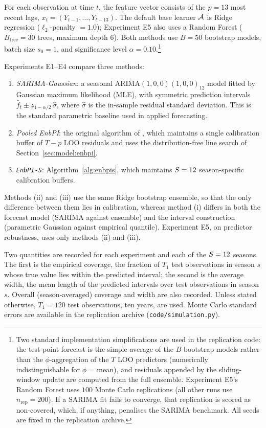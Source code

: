 For each observation at time $t$, the feature vector consists of the
$p = 13$ most recent lags, $x_t = (Y_{t-1}, \ldots, Y_{t-13})$.
The default base learner $\mathcal{A}$ is Ridge regression
($\ell_2$-penalty $= 1.0$); Experiment E5 also uses a Random Forest
($B_{\mathrm{tree}} = 30$ trees, maximum depth 6).  Both methods use
$B = 50$ bootstrap models, batch size $s_0 = 1$, and significance
level $\alpha = 0.10$.\footnote{Two standard implementation
simplifications are used in the replication code: the test-point
forecast is the simple average of the $B$ bootstrap models rather
than the $\phi$-aggregation of the $T$ LOO predictors (numerically
indistinguishable for $\phi$ = mean), and residuals appended by the
sliding-window update are computed from the full ensemble.
Experiment E5's Random Forest uses $100$ Monte Carlo replications
(all other runs use $n_{\mathrm{rep}} = 200$).  If a SARIMA fit fails
to converge, that replication is scored as non-covered, which, if
anything, penalises the SARIMA benchmark.  All seeds are fixed in the
replication archive.}

Experiments E1--E4 compare three methods:
\begin{enumerate}[label=(\roman*)]
  \item \emph{SARIMA-Gaussian}: a seasonal ARIMA$(1,0,0)(1,0,0)_{12}$
    model fitted by Gaussian maximum likelihood (MLE), with
    symmetric prediction intervals
    $\hat{f}_t \pm z_{1-\alpha/2}\,\hat{\sigma}$,
    where $\hat{\sigma}$ is the in-sample residual standard deviation.
    This is the standard parametric baseline used in applied
    forecasting.
  \item \emph{Pooled EnbPI}: the original algorithm of
    \citet{xu2023conformal}, which maintains a single calibration
    buffer of $T - p$ LOO residuals and uses the distribution-free
    line search of Section~\ref{sec:model:enbpi}.
  \item \emph{\texttt{EnbPI-S}}: Algorithm~\ref{alg:enbpis},
    which maintains $S = 12$ season-specific calibration buffers.
\end{enumerate}
Methods (ii) and (iii) use the same Ridge bootstrap ensemble, so that
the only difference between them lies in calibration, whereas
method (i) differs in both the forecast model (SARIMA against
ensemble) and the interval construction (parametric Gaussian against
empirical quantile).  Experiment E5, on predictor robustness, uses
only methods (ii) and (iii).

Two quantities are recorded for each experiment and each of the
$S = 12$ seasons.  The first is the empirical coverage, the
fraction of $T_1$ test observations in season $s$ whose true value
lies within the predicted interval; the second is the average width,
the mean length of the predicted intervals over test observations in
season $s$.  Overall
(season-averaged) coverage and width are also recorded.  Unless
stated otherwise, $T_1 = 120$ test observations, ten years, are used.
Monte Carlo standard errors are available in the replication archive
(\texttt{code/simulation.py}).

